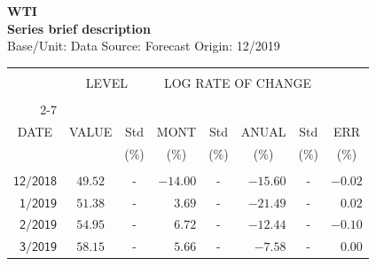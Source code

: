 \documentclass[11pt,a4paper]{article}
\begin{document}
\begin{center}
\textbf{WTI} \\ 
\textbf{Series brief description} \\ 
Base/Unit: \space \space \space Data Source: \space \space \space Forecast Origin: 12/2019 \\ 
\end{center}

\noindent\begin{minipage}[t]{0.54\textwidth}\vspace*{0pt}\small
\begin{tabular}{rccrcrcr}
\hline
\multicolumn{1}{|c|}{} & \multicolumn{2}{c|}{} & \multicolumn{4}{c}{} & \multicolumn{1}{|c|}{}\vspace{-.10in}\\
\multicolumn{1}{|c|}{} & \multicolumn{2}{c|}{LEVEL} & \multicolumn{4}{c}{LOG RATE OF CHANGE} & \multicolumn{1}{|c|}{}\\
\multicolumn{1}{|c|}{} & \multicolumn{2}{c|}{} & \multicolumn{4}{c}{} & \multicolumn{1}{|c|}{}\vspace{-.10in}\\ \cline{2-7}
\multicolumn{1}{|c|}{} & \multicolumn{1}{c|}{} & \multicolumn{1}{c|}{} & \multicolumn{1}{c|}{} & \multicolumn{1}{c|}{} & \multicolumn{1}{c|}{} & \multicolumn{1}{c|}{} & \multicolumn{1}{c|}{}\vspace{-.05in}\\
\multicolumn{1}{|c|}{DATE} & \multicolumn{1}{c|}{VALUE} & \multicolumn{1}{c|}{Std} & \multicolumn{1}{c|}{MONT} & \multicolumn{1}{c|}{Std} & \multicolumn{1}{c|}{ANUAL} & \multicolumn{1}{c|}{Std} & \multicolumn{1}{c|}{ERR}\\
\multicolumn{1}{|c|}{} & \multicolumn{1}{c|}{} & \multicolumn{1}{c|}{($\%$)} & \multicolumn{1}{c|}{($\%$)} & \multicolumn{1}{c|}{($\%$)} & \multicolumn{1}{c|}{($\%$)} & \multicolumn{1}{c|}{($\%$)} & \multicolumn{1}{c|}{($\%$)}\\
\hline \\
$\mathsf{12/2018}$ & $\mathsf{49.52}$ & - & $\mathsf{-14.00}$ & - & $\mathsf{-15.60}$ & - & $\mathsf{-0.02}$ \\
$\mathsf{1/2019}$ & $\mathsf{51.38}$ & - & $\mathsf{3.69}$ & - & $\mathsf{-21.49}$ & - & $\mathsf{0.02}$ \\
$\mathsf{2/2019}$ & $\mathsf{54.95}$ & - & $\mathsf{6.72}$ & - & $\mathsf{-12.44}$ & - & $\mathsf{-0.10}$ \\
$\mathsf{3/2019}$ & $\mathsf{58.15}$ & - & $\mathsf{5.66}$ & - & $\mathsf{-7.58}$ & - & $\mathsf{0.00}$ \\

\end{tabular}
\end{minipage}
\end{document}
